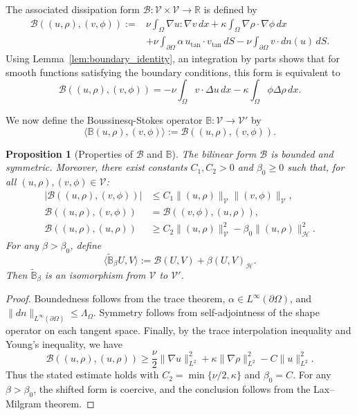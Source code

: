 \documentclass[11pt,reqno]{amsart}
\theoremstyle{plain}
\newtheorem{proposition}[thm]{Proposition}
\numberwithin{equation}{section}
\newcommand{\R}{\mathbb{R}}
\newcommand{\nn}{{n}}
\newcommand{\tanproj}{\text{tan}}
\newcommand{\boussop}{\mathbb{B}} %
\begin{document}
The associated dissipation form $\mathscr{B}: \mathcal{V}\times\mathcal{V}\to\R$ is defined by
\begin{align*}
\mathscr{B}((u,\rho),(v,\phi)):=&\nu \int_\Omega\nabla u:\nabla v\,dx+\kappa\int_\Omega\nabla\rho\cdot\nabla\phi\,dx \\
&+\nu\int_{\partial\Omega}\alpha\,u_{\tanproj} \cdot{v}_{\tanproj}\,dS-\nu\int_{\partial\Omega}v\cdot d\nn(u)\,dS.
\end{align*}
Using Lemma~\ref{lem:boundary_identity}, an integration by parts shows that for smooth functions satisfying the boundary conditions, this form is equivalent to
\[
\mathscr{B}(({u},\rho),({v},\phi))=-\nu \int_\Omega v\cdot\Delta u\,dx-\kappa\int_\Omega\phi\Delta\rho\,dx.
\]

We now define the Boussinesq-Stokes operator $\boussop:\mathcal{V}\to\mathcal{V}'$ by
\[
\langle\boussop(u,\rho),(v,\phi)\rangle:=\mathscr{B}((u,\rho),(v,\phi)).
\]

\begin{proposition}[Properties of $\mathscr{B}$ and $\boussop$] \label{prop:bouss_op_props}
The bilinear form $\mathscr{B}$ is bounded and symmetric. Moreover, there exist constants $C_1,C_2>0$ and $\beta_0\ge0$ such that, for all $(u,\rho),(v,\phi) \in \mathcal{V}$:
\begin{align*}
|\mathscr{B}((u,\rho),(v,\phi))| &\leq C_1 \| (u,\rho) \|_{\mathcal{V}} \| (v, \phi) \|_{\mathcal{V}}, \\
\mathscr{B}((u,\rho),(v,\phi)) &= \mathscr{B}((v,\phi),(u,\rho)), \\
\mathscr{B}((u,\rho),(u,\rho)) &\geq C_2 \| (u,\rho) \|_{\mathcal{V}}^2 - \beta_0 \| (u,\rho) \|_{\mathcal{H}}^2.
\end{align*}
For any $\beta>\beta_0$, define
\[
\langle\widetilde{\boussop}_\beta U,V\rangle
:=\mathscr B(U,V)+\beta(U,V)_{\mathcal H}.
\]
Then $\widetilde{\boussop}_\beta$ is an isomorphism from $\mathcal{V}$ to $\mathcal{V}'$.
\end{proposition}

\begin{proof}
Boundedness follows from the trace theorem, $\alpha\in L^\infty(\partial\Omega)$, and $\|dn\|_{L^\infty(\partial\Omega)}\le\Lambda_\Omega$. Symmetry follows from self-adjointness of the shape operator on each tangent space. Finally, by the trace interpolation inequality and Young's inequality, we have 
\[
\mathscr B((u,\rho),(u,\rho))
\ge \frac{\nu}{2}\|\nabla u\|_{L^2}^2+\kappa\|\nabla\rho\|_{L^2}^2-C\|u\|_{L^2}^2.
\]
Thus the stated estimate holds with $C_2=\min\{\nu/2,\kappa\}$ and $\beta_0=C$. For any $\beta>\beta_0$, the shifted form is coercive, and the conclusion follows from the Lax--Milgram theorem.
\end{proof}
\end{document}
